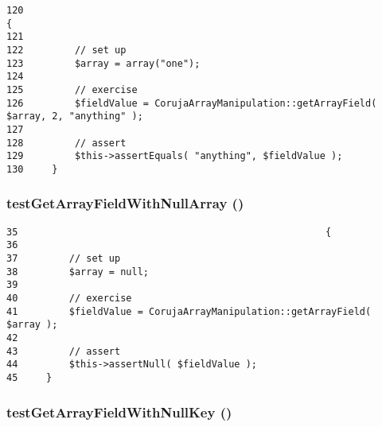 \begin{Code}\begin{verbatim}120                                                                             {
121 
122         // set up
123         $array = array("one");
124 
125         // exercise
126         $fieldValue = CorujaArrayManipulation::getArrayField( $array, 2, "anything" );
127 
128         // assert
129         $this->assertEquals( "anything", $fieldValue );
130     }
\end{verbatim}
\end{Code}


\hypertarget{class_coruja_array_manipulation_test_78b308f298161af48c3887029536a731}{
\subsubsection[{testGetArrayFieldWithNullArray}]{\setlength{\rightskip}{0pt plus 5cm}testGetArrayFieldWithNullArray ()}}
\label{class_coruja_array_manipulation_test_78b308f298161af48c3887029536a731}




\begin{Code}\begin{verbatim}35                                                      {
36 
37         // set up
38         $array = null;
39 
40         // exercise
41         $fieldValue = CorujaArrayManipulation::getArrayField( $array );
42 
43         // assert
44         $this->assertNull( $fieldValue );
45     }
\end{verbatim}
\end{Code}


\hypertarget{class_coruja_array_manipulation_test_ea02b7a01e6a9cd620b4848be8559b7a}{
\subsubsection[{testGetArrayFieldWithNullKey}]{\setlength{\rightskip}{0pt plus 5cm}testGetArrayFieldWithNullKey ()}}
\label{class_coruja_array_manipulation_test_ea02b7a01e6a9cd620b4848be8559b7a}




